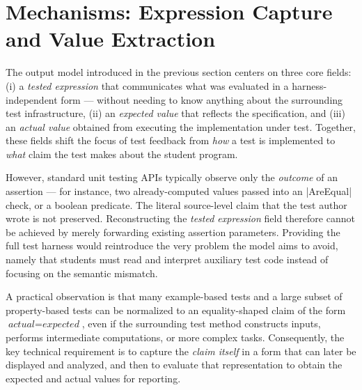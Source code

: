 \section{Mechanisms: Expression Capture and Value Extraction} %
\label{sctn:mechanisms-expression-capture-and-value-extraction} %




The output model introduced in the previous section centers on three core
fields: (i) a \emph{tested expression} that communicates what was evaluated in a
harness-independent form --- without needing to know anything about the
surrounding test infrastructure, (ii) an \emph{expected value} that reflects
the specification, and (iii) an \emph{actual value} obtained from executing the
implementation under test. Together, these fields shift the focus of test
feedback from \emph{how} a test is implemented to \emph{what} claim the test
makes about the student program.

\skipM However, standard unit testing APIs typically observe only the
\emph{outcome} of an assertion --- for instance, two already-computed values
passed into an \fsharp|AreEqual| check, or a boolean predicate. The literal
source-level claim that the test author wrote is not preserved. Reconstructing
the \emph{tested expression} field therefore cannot be achieved by merely
forwarding existing assertion parameters. Providing the full test harness would
reintroduce the very problem the model aims to avoid, namely that students must
read and interpret auxiliary test code instead of focusing on the semantic
mismatch.

\skipM A practical observation is that many example-based tests and a large
subset of property-based tests can be normalized to an equality-shaped claim of
the form $\textit{actual} = \textit{expected}$, even if the surrounding test
method constructs inputs, performs intermediate computations, or more complex
tasks. Consequently, the key technical requirement is to capture the \emph{claim
itself} in a form that can later be displayed and analyzed, and then to evaluate
that representation to obtain the expected and actual values for reporting.


